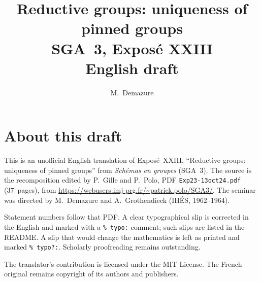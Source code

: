 \documentclass[11pt,a4paper,oneside]{amsbook}
\title[SGA~3, Expos\'e XXIII (English draft)]{Reductive groups: uniqueness of pinned groups\\
{\normalsize SGA~3, Expos\'e XXIII\\English draft}}
\author{M.\ Demazure}
\date{}
\begin{document}
\frontmatter
\maketitle

\chapter*{About this draft}
This is an unofficial English translation of Expos\'e~XXIII, ``Reductive groups: uniqueness of pinned groups''
from \textit{Sch\'emas en groupes} (SGA~3).
The source is the recomposition edited by P.~Gille and P.~Polo,
PDF \texttt{Exp23-13oct24.pdf} (37~pages),
from \url{https://webusers.imj-prg.fr/~patrick.polo/SGA3/}.
The seminar was directed by M.~Demazure and A.~Grothendieck
(IH\'ES, 1962--1964).

Statement numbers follow that PDF. A clear typographical slip is
corrected in the English and marked with a \texttt{\% typo:} comment;
such slips are listed in the README. A slip that would change the
mathematics is left as printed and marked \texttt{\% typo?:}.
Scholarly proofreading remains outstanding.

The translator's contribution is licensed under the MIT License.
The French original remains copyright of its authors and publishers.

\tableofcontents
\mainmatter






\end{document}
